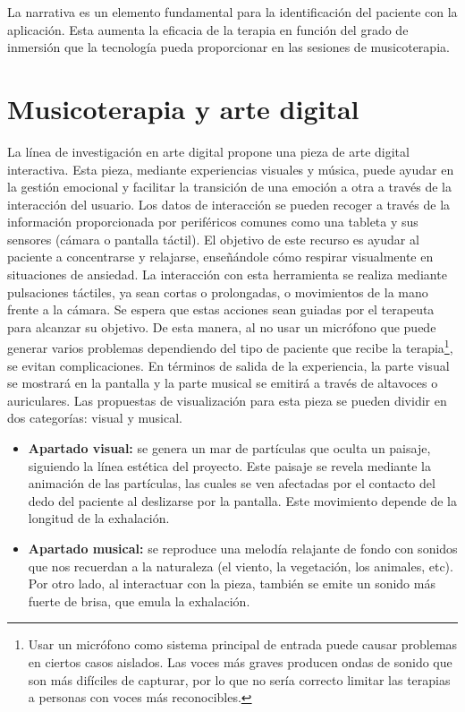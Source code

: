 La narrativa es un elemento fundamental para la identificación del paciente con la aplicación. Esta aumenta la eficacia de la terapia en función del grado de inmersión que la tecnología pueda proporcionar en las sesiones de musicoterapia.

\section{Musicoterapia y arte digital}

La línea de investigación en arte digital propone una pieza de arte digital interactiva. Esta pieza, mediante experiencias visuales y música, puede ayudar en la gestión emocional y facilitar la transición de una emoción a otra a través de la interacción del usuario. Los datos de interacción se pueden recoger a través de la información proporcionada por periféricos comunes como una tableta y sus sensores (cámara o pantalla táctil). El objetivo de este recurso es ayudar al paciente a concentrarse y relajarse, enseñándole cómo respirar visualmente en situaciones de ansiedad. La interacción con esta herramienta se realiza mediante pulsaciones táctiles, ya sean cortas o prolongadas, o movimientos de la mano frente a la cámara. Se espera que estas acciones sean guiadas por el terapeuta para alcanzar su objetivo. De esta manera, al no usar un micrófono que puede generar varios problemas dependiendo del tipo de paciente que recibe la terapia\footnote{Usar un micrófono como sistema principal de entrada puede causar problemas en ciertos casos aislados. Las voces más graves producen ondas de sonido que son más difíciles de capturar, por lo que no sería correcto limitar las terapias a personas con voces más reconocibles.}, se evitan complicaciones. En términos de salida de la experiencia, la parte visual se mostrará en la pantalla y la parte musical se emitirá a través de altavoces o auriculares. Las propuestas de visualización para esta pieza se pueden dividir en dos categorías: visual y musical.

\begin{itemize}
	\item \textbf{Apartado visual:} se genera un mar de partículas que oculta un paisaje, siguiendo la línea estética del proyecto. Este paisaje se revela mediante la animación de las partículas, las cuales se ven afectadas por el contacto del dedo del paciente al deslizarse por la pantalla. Este movimiento depende de la longitud de la exhalación.
	\item \textbf{Apartado musical:} se reproduce una melodía relajante de fondo con sonidos que nos recuerdan a la naturaleza (el viento, la vegetación, los animales, etc). Por otro lado, al interactuar con la pieza, también se emite un sonido más fuerte de brisa, que emula la exhalación.
\end{itemize}

